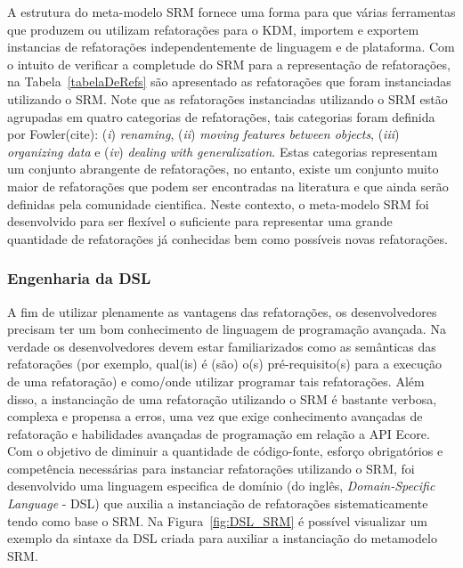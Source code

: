 A estrutura do meta-modelo SRM fornece uma forma para que várias ferramentas que produzem ou utilizam refatorações para o KDM, importem e exportem instancias de refatorações independentemente de linguagem e de plataforma. Com o intuito de verificar a completude do SRM para a representação de refatorações, na Tabela~\ref{tabelaDeRefs} são apresentado as refatorações que foram instanciadas utilizando o SRM. Note que as refatorações instanciadas utilizando o SRM estão agrupadas em quatro categorias de refatorações, tais categorias foram definida por Fowler(cite): (\textit{i}) \textit{renaming}, (\textit{ii}) \textit{moving features between objects}, (\textit{iii}) \textit{organizing data} e (\textit{iv}) \textit{dealing with generalization}. Estas categorias representam um conjunto abrangente de refatorações, no entanto, existe um conjunto muito maior de refatorações que podem ser encontradas na literatura e que ainda serão definidas pela comunidade cientifica. Neste contexto, o meta-modelo SRM foi desenvolvido para ser flexível o suficiente para representar uma grande quantidade de refatorações já conhecidas bem como possíveis novas refatorações.


\subsubsection{Engenharia da DSL}\label{Engenharia_da_DSL}

A fim de utilizar plenamente as vantagens das refatorações, os desenvolvedores precisam ter um bom conhecimento de linguagem de programação avançada. Na verdade os desenvolvedores devem estar familiarizados como as semânticas das refatorações (por exemplo, qual(is) é (são) o(s) pré-requisito(s) para a execução de uma refatoração) e como/onde utilizar programar tais refatorações. Além disso, a instanciação de uma refatoração utilizando o SRM é bastante verbosa, complexa e propensa a erros, uma vez que exige conhecimento avançadas de refatoração e habilidades avançadas de programação em relação a API Ecore. Com o objetivo de diminuir a quantidade de código-fonte, esforço obrigatórios e competência necessárias para instanciar refatorações utilizando o SRM, foi desenvolvido uma linguagem especifica de domínio (do inglês, \textit{Domain-Specific Language} - DSL) que auxilia a instanciação de refatorações sistematicamente tendo como base o SRM. Na  Figura~\ref{fig:DSL_SRM} é possível visualizar um exemplo da sintaxe da DSL criada para auxiliar a instanciação do metamodelo SRM.

